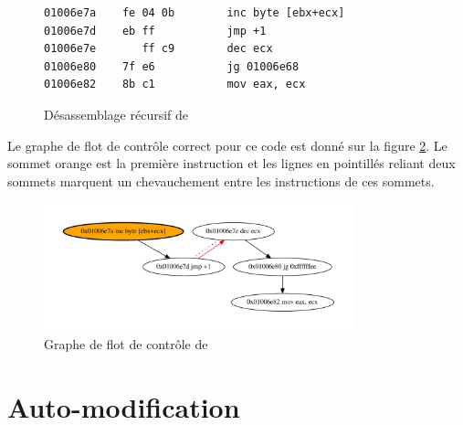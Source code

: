 \begin{figure}
\begin{lstlisting}[language={[x86masm]Assembler}, escapechar=~]
01006e7a    fe 04 0b        inc byte [ebx+ecx]
01006e7d    eb ff           jmp +1
01006e7e       ff c9        dec ecx
01006e80    7f e6           jg 01006e68
01006e82    8b c1           mov eax, ecx
\end{lstlisting}
\caption{Désassemblage récursif de \telock}
\label{fig:telock_obf_asm}
\end{figure}

Le graphe de flot de contrôle correct pour ce code est donné sur la figure \ref{fig:telock_cfg}. Le sommet orange est la première instruction et les lignes en pointillés reliant deux sommets marquent un chevauchement entre les instructions de ces sommets.

\begin{figure}
\begin{center}
\includegraphics[width=0.8\textwidth]{supports/disasm/telock/telock.pdf}
\end{center}
\caption{Graphe de flot de contrôle de \telock}
\label{fig:telock_cfg}
\end{figure}

\section{Auto-modification}


